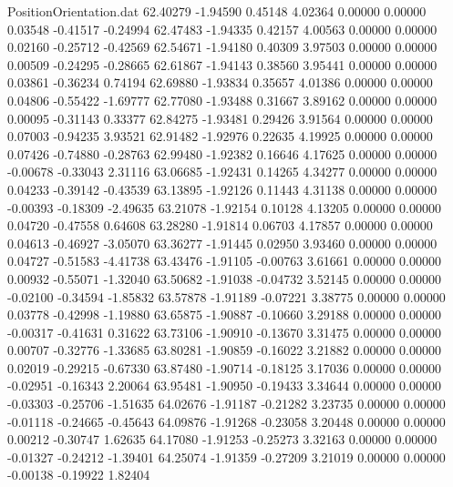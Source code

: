 \begin{filecontents}{PositionOrientation.dat}
  62.40279   -1.94590    0.45148     4.02364    0.00000    0.00000    0.03548   -0.41517   -0.24994
  62.47483   -1.94335    0.42157     4.00563    0.00000    0.00000    0.02160   -0.25712   -0.42569
  62.54671   -1.94180    0.40309     3.97503    0.00000    0.00000    0.00509   -0.24295   -0.28665
  62.61867   -1.94143    0.38560     3.95441    0.00000    0.00000    0.03861   -0.36234    0.74194
  62.69880   -1.93834    0.35657     4.01386    0.00000    0.00000    0.04806   -0.55422   -1.69777
  62.77080   -1.93488    0.31667     3.89162    0.00000    0.00000    0.00095   -0.31143    0.33377
  62.84275   -1.93481    0.29426     3.91564    0.00000    0.00000    0.07003   -0.94235    3.93521
  62.91482   -1.92976    0.22635     4.19925    0.00000    0.00000    0.07426   -0.74880   -0.28763
  62.99480   -1.92382    0.16646     4.17625    0.00000    0.00000   -0.00678   -0.33043    2.31116
  63.06685   -1.92431    0.14265     4.34277    0.00000    0.00000    0.04233   -0.39142   -0.43539
  63.13895   -1.92126    0.11443     4.31138    0.00000    0.00000   -0.00393   -0.18309   -2.49635
  63.21078   -1.92154    0.10128     4.13205    0.00000    0.00000    0.04720   -0.47558    0.64608
  63.28280   -1.91814    0.06703     4.17857    0.00000    0.00000    0.04613   -0.46927   -3.05070
  63.36277   -1.91445    0.02950     3.93460    0.00000    0.00000    0.04727   -0.51583   -4.41738
  63.43476   -1.91105   -0.00763     3.61661    0.00000    0.00000    0.00932   -0.55071   -1.32040
  63.50682   -1.91038   -0.04732     3.52145    0.00000    0.00000   -0.02100   -0.34594   -1.85832
  63.57878   -1.91189   -0.07221     3.38775    0.00000    0.00000    0.03778   -0.42998   -1.19880
  63.65875   -1.90887   -0.10660     3.29188    0.00000    0.00000   -0.00317   -0.41631    0.31622
  63.73106   -1.90910   -0.13670     3.31475    0.00000    0.00000    0.00707   -0.32776   -1.33685
  63.80281   -1.90859   -0.16022     3.21882    0.00000    0.00000    0.02019   -0.29215   -0.67330
  63.87480   -1.90714   -0.18125     3.17036    0.00000    0.00000   -0.02951   -0.16343    2.20064
  63.95481   -1.90950   -0.19433     3.34644    0.00000    0.00000   -0.03303   -0.25706   -1.51635
  64.02676   -1.91187   -0.21282     3.23735    0.00000    0.00000   -0.01118   -0.24665   -0.45643
  64.09876   -1.91268   -0.23058     3.20448    0.00000    0.00000    0.00212   -0.30747    1.62635
  64.17080   -1.91253   -0.25273     3.32163    0.00000    0.00000   -0.01327   -0.24212   -1.39401
  64.25074   -1.91359   -0.27209     3.21019    0.00000    0.00000   -0.00138   -0.19922    1.82404

\end{filecontents}
